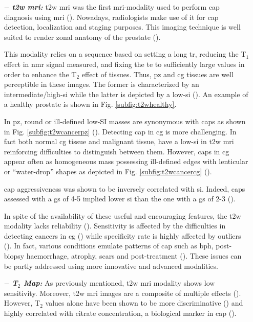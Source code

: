 \begin{enumerate}[leftmargin=*]
\item[$-$] \textbf{\textit{\ac{t2w} \ac{mri}:}} \ac{t2w} \ac{mri} was the first \ac{mri}-modality used to perform \ac{cap} diagnosis using \ac{mri} (\cite{Hricak1983}). Nowadays, radiologists make use of it for \ac{cap} detection, localization and staging purposes. This imaging technique is well suited to render zonal anatomy of the prostate (\cite{Barentsz2012}). 

This modality relies on a sequence based on setting a long \ac{tr}, reducing the T$_1$ effect in \ac{nmr} signal measured, and fixing the \ac{te} to sufficiently large values in order to enhance the T$_2$ effect of tissues. Thus, \ac{pz} and \ac{cg} tissues are well perceptible in these images. The former is characterized by an intermediate/high-\ac{si} while the latter is depicted by a low-\ac{si} (\cite{Hricak1987}). An example of a healthy prostate is shown in Fig. \ref{subfig:t2whealthy}.

In \ac{pz}, round or ill-defined low-SI masses are synonymous with \acp{cap} as shown in Fig. \ref{subfig:t2wcancerpz} (\cite{Hricak1983}). Detecting \ac{cap} in \ac{cg} is more challenging. In fact both normal \ac{cg} tissue and malignant tissue, have a low-\ac{si} in \ac{t2w} \ac{mri} reinforcing difficulties to distinguish between them. However, \acp{cap} in \ac{cg} appear often as homogeneous mass possessing ill-defined edges with lenticular or ``water-drop'' shapes as depicted in Fig. \ref{subfig:t2wcancercg} (\cite{Akin2006, Barentsz2012}). 

\ac{cap} aggressiveness was shown to be inversely correlated with \ac{si}. Indeed, \acp{cap} assessed with a \ac{gs} of 4-5 implied lower \ac{si} than the one with a \ac{gs} of 2-3 (\cite{Wang2008}).

In spite of the availability of these useful and encouraging features, the \ac{t2w} modality lacks reliability (\cite{Kirkham2006,Hoeks2011}). Sensitivity is affected by the difficulties in detecting cancers in \ac{cg} (\cite{Kirkham2006}) while specificity rate is highly affected by outliers (\cite{Barentsz2012}). In fact, various conditions emulate patterns of \ac{cap} such as \ac{bph}, post-biopsy haemorrhage, atrophy, scars and post-treatment (\cite{Hricak1987,Quint1991,Scheidler1999,Cruz2002,Barentsz2012}). These issues can be partly addressed using more innovative and advanced modalities.

\item[$-$] \textbf{\textit{T$_2$ Map:}} As previously mentioned, \ac{t2w} \ac{mri} modality shows low sensitivity. Moreover, \ac{t2w} \ac{mri} images are a composite of multiple effects (\cite{Hegde2013}). However, T$_2$ values alone have been shown to be more discriminative (\cite{Liu2011}) and highly correlated with citrate concentration, a biological marker in \ac{cap} (\cite{Liney1996,Liney1997}). 


\end{enumerate}
